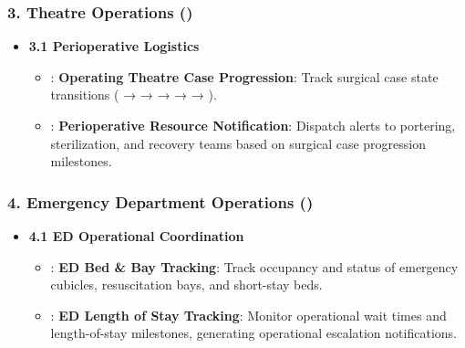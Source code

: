 \subsubsection*{3. Theatre Operations (\texttt{})}
\label{rad:enabling:492}

\begin{itemize}

\item
\textbf{3.1 Perioperative Logistics}


\begin{itemize}

\item
\texttt{}: \textbf{Operating Theatre Case Progression}: Track surgical case state transitions (\texttt{} → \texttt{} → \texttt{} → \texttt{} → \texttt{} → \texttt{}).



\item
\texttt{}: \textbf{Perioperative Resource Notification}: Dispatch alerts to portering, sterilization, and recovery teams based on surgical case progression milestones.



\end{itemize}


\end{itemize}
\label{rad:enabling:496}
\subsubsection*{4. Emergency Department Operations (\texttt{})}
\label{rad:enabling:497}

\begin{itemize}

\item
\textbf{4.1 ED Operational Coordination}


\begin{itemize}

\item
\texttt{}: \textbf{ED Bed \& Bay Tracking}: Track occupancy and status of emergency cubicles, resuscitation bays, and short-stay beds.



\item
\texttt{}: \textbf{ED Length of Stay Tracking}: Monitor operational wait times and length-of-stay milestones, generating operational escalation notifications.



\end{itemize}


\end{itemize}
\label{rad:enabling:501}
